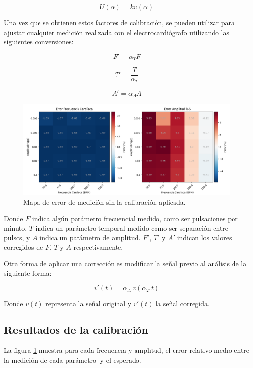 \documentclass[conference]{IEEEtran}
\begin{document}
$$U(\alpha) = k u(\alpha)$$

Una vez que se obtienen estos factores de calibración, se pueden utilizar para ajustar
cualquier medición realizada con el electrocardiógrafo utilizando las siguientes
conversiones:

$$ F' = \alpha_{T} F$$

$$ T' = \frac{T}{\alpha_{T}} $$

$$ A' = \alpha_{A} A$$

\begin{figure}[t]
    \centering
    \includegraphics[width=\textwidth]{figs/plot_error_sin_calib.png}
    \caption{Mapa de error de medición sin la calibración aplicada.}
    \label{fig:plot_errpr_sin_calib}

\end{figure}

Donde $F$ indica algún parámetro frecuencial medido, como ser pulsaciones por minuto,
$T$ indica un parámetro temporal medido como ser separación entre pulsos, y
$A$ indica un parámetro de amplitud.
$F'$, $T'$ y $A'$ indican los valores corregidos de $F$, $T$ y $A$ respectivamente.
 
Otra forma de aplicar una corrección es modificar la señal previo al análisis
de la siguiente forma:

$$ v'(t) = \alpha_{A} ~ v(\alpha_T ~ t)$$

Donde $v(t)$ representa la señal original y $v'(t)$ la señal corregida.

 

\subsection{Resultados de la calibración}

La figura \ref{fig:plot_errpr_sin_calib} muestra para cada frecuencia y amplitud,
el error relativo medio entre la medición de cada parámetro, y el esperado.
\end{document}

